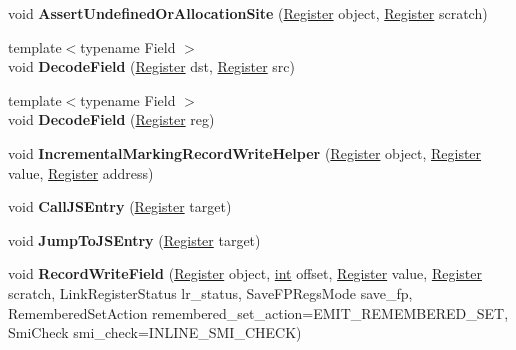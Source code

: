 \begin{DoxyCompactItemize}
void {\bfseries Assert\+Undefined\+Or\+Allocation\+Site} (\mbox{\hyperlink{classv8_1_1internal_1_1Register}{Register}} object, \mbox{\hyperlink{classv8_1_1internal_1_1Register}{Register}} scratch)
\item 
\mbox{\label{classv8_1_1internal_1_1MacroAssembler_a255a40c7f619cdf00e2b66de3afaf6f1}} 
{\footnotesize template$<$typename Field $>$ }\\void {\bfseries Decode\+Field} (\mbox{\hyperlink{classv8_1_1internal_1_1Register}{Register}} dst, \mbox{\hyperlink{classv8_1_1internal_1_1Register}{Register}} src)
\item 
\mbox{\label{classv8_1_1internal_1_1MacroAssembler_a132efbdb5d6abe37ed26edc851c715f0}} 
{\footnotesize template$<$typename Field $>$ }\\void {\bfseries Decode\+Field} (\mbox{\hyperlink{classv8_1_1internal_1_1Register}{Register}} reg)
\item 
\mbox{\label{classv8_1_1internal_1_1MacroAssembler_abcee3f965e4bf2002f13d26238a30bd7}} 
void {\bfseries Incremental\+Marking\+Record\+Write\+Helper} (\mbox{\hyperlink{classv8_1_1internal_1_1Register}{Register}} object, \mbox{\hyperlink{classv8_1_1internal_1_1Register}{Register}} value, \mbox{\hyperlink{classv8_1_1internal_1_1Register}{Register}} address)
\item 
\mbox{\label{classv8_1_1internal_1_1MacroAssembler_a74c3a9f7c17e99334addf45c3dd17ff9}} 
void {\bfseries Call\+J\+S\+Entry} (\mbox{\hyperlink{classv8_1_1internal_1_1Register}{Register}} target)
\item 
\mbox{\label{classv8_1_1internal_1_1MacroAssembler_aa7b37b7bfd437a5c063b239331eb20c6}} 
void {\bfseries Jump\+To\+J\+S\+Entry} (\mbox{\hyperlink{classv8_1_1internal_1_1Register}{Register}} target)
\item 
\mbox{\label{classv8_1_1internal_1_1MacroAssembler_a612d90391b176f5d40e0349ed4a82439}} 
void {\bfseries Record\+Write\+Field} (\mbox{\hyperlink{classv8_1_1internal_1_1Register}{Register}} object, \mbox{\hyperlink{classint}{int}} offset, \mbox{\hyperlink{classv8_1_1internal_1_1Register}{Register}} value, \mbox{\hyperlink{classv8_1_1internal_1_1Register}{Register}} scratch, Link\+Register\+Status lr\+\_\+status, Save\+F\+P\+Regs\+Mode save\+\_\+fp, Remembered\+Set\+Action remembered\+\_\+set\+\_\+action=E\+M\+I\+T\+\_\+\+R\+E\+M\+E\+M\+B\+E\+R\+E\+D\+\_\+\+S\+ET, Smi\+Check smi\+\_\+check=I\+N\+L\+I\+N\+E\+\_\+\+S\+M\+I\+\_\+\+C\+H\+E\+CK)

\end{DoxyCompactItemize}
